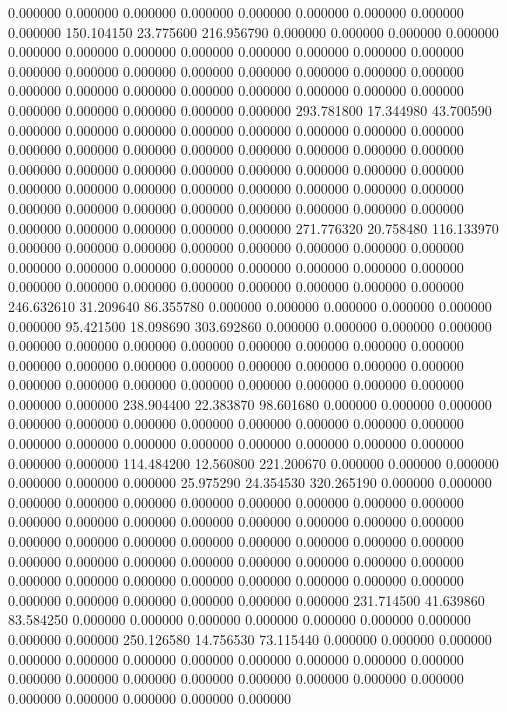 0.000000 0.000000 0.000000
0.000000 0.000000 0.000000
0.000000 0.000000 0.000000
150.104150 23.775600 216.956790
0.000000 0.000000 0.000000
0.000000 0.000000 0.000000
0.000000 0.000000 0.000000
0.000000 0.000000 0.000000
0.000000 0.000000 0.000000
0.000000 0.000000 0.000000
0.000000 0.000000 0.000000
0.000000 0.000000 0.000000
0.000000 0.000000 0.000000
0.000000 0.000000 0.000000
0.000000 0.000000 0.000000
293.781800 17.344980 43.700590
0.000000 0.000000 0.000000
0.000000 0.000000 0.000000
0.000000 0.000000 0.000000
0.000000 0.000000 0.000000
0.000000 0.000000 0.000000
0.000000 0.000000 0.000000
0.000000 0.000000 0.000000
0.000000 0.000000 0.000000
0.000000 0.000000 0.000000
0.000000 0.000000 0.000000
0.000000 0.000000 0.000000
0.000000 0.000000 0.000000
0.000000 0.000000 0.000000
0.000000 0.000000 0.000000
0.000000 0.000000 0.000000
271.776320 20.758480 116.133970
0.000000 0.000000 0.000000
0.000000 0.000000 0.000000
0.000000 0.000000 0.000000
0.000000 0.000000 0.000000
0.000000 0.000000 0.000000
0.000000 0.000000 0.000000
0.000000 0.000000 0.000000
0.000000 0.000000 0.000000
246.632610 31.209640 86.355780
0.000000 0.000000 0.000000
0.000000 0.000000 0.000000
95.421500 18.098690 303.692860
0.000000 0.000000 0.000000
0.000000 0.000000 0.000000
0.000000 0.000000 0.000000
0.000000 0.000000 0.000000
0.000000 0.000000 0.000000
0.000000 0.000000 0.000000
0.000000 0.000000 0.000000
0.000000 0.000000 0.000000
0.000000 0.000000 0.000000
0.000000 0.000000 0.000000
238.904400 22.383870 98.601680
0.000000 0.000000 0.000000
0.000000 0.000000 0.000000
0.000000 0.000000 0.000000
0.000000 0.000000 0.000000
0.000000 0.000000 0.000000
0.000000 0.000000 0.000000
0.000000 0.000000 0.000000
114.484200 12.560800 221.200670
0.000000 0.000000 0.000000
0.000000 0.000000 0.000000
25.975290 24.354530 320.265190
0.000000 0.000000 0.000000
0.000000 0.000000 0.000000
0.000000 0.000000 0.000000
0.000000 0.000000 0.000000
0.000000 0.000000 0.000000
0.000000 0.000000 0.000000
0.000000 0.000000 0.000000
0.000000 0.000000 0.000000
0.000000 0.000000 0.000000
0.000000 0.000000 0.000000
0.000000 0.000000 0.000000
0.000000 0.000000 0.000000
0.000000 0.000000 0.000000
0.000000 0.000000 0.000000
0.000000 0.000000 0.000000
0.000000 0.000000 0.000000
231.714500 41.639860 83.584250
0.000000 0.000000 0.000000
0.000000 0.000000 0.000000
0.000000 0.000000 0.000000
250.126580 14.756530 73.115440
0.000000 0.000000 0.000000
0.000000 0.000000 0.000000
0.000000 0.000000 0.000000
0.000000 0.000000 0.000000
0.000000 0.000000 0.000000
0.000000 0.000000 0.000000
0.000000 0.000000 0.000000
0.000000 0.000000 0.000000
